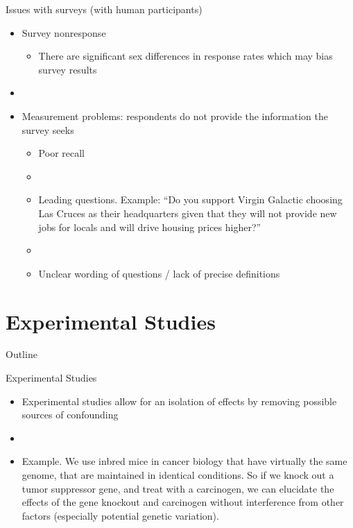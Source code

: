 \documentclass[xcolor=dvipsnames]{beamer}
\begin{document}
\begin{frame}{Issues with surveys (with human participants)}
\begin{itemize}
	\item Survey nonresponse \pause
	\begin{itemize}
		\item There are significant sex differences in response rates which may bias survey results \pause
	\end{itemize}
	\item[]
	\item Measurement problems: respondents do not provide the information the survey seeks \pause
	\begin{itemize}
		\item Poor recall \pause
		\item[]
		\item Leading questions. Example: ``Do you support Virgin Galactic choosing Las Cruces as their headquarters given that they will not provide new jobs for locals and will drive housing prices  higher?'' \pause
		\item[]
		\item Unclear wording of questions / lack of precise definitions 
	\end{itemize}
\end{itemize}
\end{frame}

\section{Experimental Studies}
\begin{frame}{Outline}
\tableofcontents[currentsection,subsectionstyle=show/shaded/hide]
\end{frame}
\begin{frame}{Experimental Studies}
	\begin{itemize}
		\item Experimental studies allow for an isolation of effects by removing possible sources of confounding \pause
		
		\item[]
		
		\item Example. We use inbred mice in cancer biology that have virtually the same genome, that are maintained in identical conditions. So if we knock out a tumor suppressor gene, and treat with a carcinogen, we can elucidate the effects of the gene knockout and carcinogen without interference from other factors (especially potential genetic variation).
		
	\end{itemize}
\end{frame}
\end{document}
